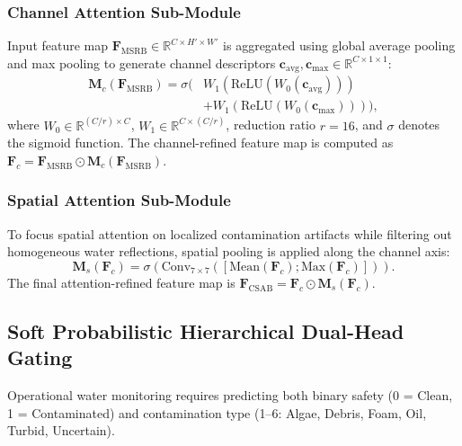 \documentclass[journal]{IEEEtran}
\begin{document}
\subsubsection{Channel Attention Sub-Module}
Input feature map $\mathbf{F}_{\text{MSRB}} \in \mathbb{R}^{C \times H' \times W'}$ is aggregated using global average pooling and max pooling to generate channel descriptors $\mathbf{c}_{\text{avg}}, \mathbf{c}_{\text{max}} \in \mathbb{R}^{C \times 1 \times 1}$:
\begin{equation}
\begin{aligned}
\mathbf{M}_c(\mathbf{F}_{\text{MSRB}}) = \sigma \big( &W_1(\text{ReLU}(W_0(\mathbf{c}_{\text{avg}}))) \\
&+ W_1(\text{ReLU}(W_0(\mathbf{c}_{\text{max}}))) \big),
\end{aligned}
\label{eq:channel_attn}
\end{equation}
where $W_0 \in \mathbb{R}^{(C/r) \times C}$, $W_1 \in \mathbb{R}^{C \times (C/r)}$, reduction ratio $r=16$, and $\sigma$ denotes the sigmoid function. The channel-refined feature map is computed as $\mathbf{F}_c = \mathbf{F}_{\text{MSRB}} \odot \mathbf{M}_c(\mathbf{F}_{\text{MSRB}})$.

\subsubsection{Spatial Attention Sub-Module}
To focus spatial attention on localized contamination artifacts while filtering out homogeneous water reflections, spatial pooling is applied along the channel axis:
\begin{equation}
\mathbf{M}_s(\mathbf{F}_c) = \sigma \left( \text{Conv}_{7 \times 7}([\text{Mean}(\mathbf{F}_c); \text{Max}(\mathbf{F}_c)]) \right).
\label{eq:spatial_attn}
\end{equation}
The final attention-refined feature map is $\mathbf{F}_{\text{CSAB}} = \mathbf{F}_c \odot \mathbf{M}_s(\mathbf{F}_c)$.

\subsection{Soft Probabilistic Hierarchical Dual-Head Gating}
Operational water monitoring requires predicting both binary safety (0 = Clean, 1 = Contaminated) and contamination type (1--6: Algae, Debris, Foam, Oil, Turbid, Uncertain).
\end{document}

